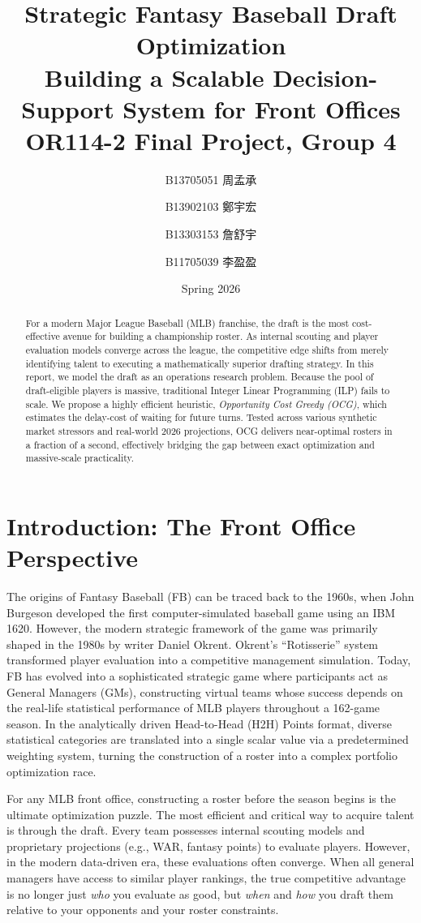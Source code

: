 \documentclass[11pt,a4paper]{article}
\title{\textbf{Strategic Fantasy Baseball Draft Optimization} \\[0.5em] \large Building a Scalable Decision-Support System for Front Offices \\[1em] \normalsize OR114-2 Final Project, Group 4}
\author{
B13705051 周孟承 \and
B13902103 鄭宇宏 \and
B13303153 詹舒宇 \and
B11705039 李盈盈
}
\date{Spring 2026}
\begin{document}
\maketitle

\begin{abstract}
For a modern Major League Baseball (MLB) franchise, the draft is the most cost-effective avenue for building a championship roster. As internal scouting and player evaluation models converge across the league, the competitive edge shifts from merely identifying talent to executing a mathematically superior drafting strategy. In this report, we model the draft as an operations research problem. Because the pool of draft-eligible players is massive, traditional Integer Linear Programming (ILP) fails to scale. We propose a highly efficient heuristic, \emph{Opportunity Cost Greedy (OCG)}, which estimates the delay-cost of waiting for future turns. Tested across various synthetic market stressors and real-world 2026 projections, OCG delivers near-optimal rosters in a fraction of a second, effectively bridging the gap between exact optimization and massive-scale practicality.
\end{abstract}

\section{Introduction: The Front Office Perspective}

The origins of Fantasy Baseball (FB) can be traced back to the 1960s, when John Burgeson developed the first computer-simulated baseball game using an IBM 1620. However, the modern strategic framework of the game was primarily shaped in the 1980s by writer Daniel Okrent. Okrent's ``Rotisserie'' system transformed player evaluation into a competitive management simulation. Today, FB has evolved into a sophisticated strategic game where participants act as General Managers (GMs), constructing virtual teams whose success depends on the real-life statistical performance of MLB players throughout a 162-game season. In the analytically driven Head-to-Head (H2H) Points format, diverse statistical categories are translated into a single scalar value via a predetermined weighting system, turning the construction of a roster into a complex portfolio optimization race.

For any MLB front office, constructing a roster before the season begins is the ultimate optimization puzzle. The most efficient and critical way to acquire talent is through the draft. Every team possesses internal scouting models and proprietary projections (e.g., WAR, fantasy points) to evaluate players. However, in the modern data-driven era, these evaluations often converge. When all general managers have access to similar player rankings, the true competitive advantage is no longer just \textit{who} you evaluate as good, but \textit{when} and \textit{how} you draft them relative to your opponents and your roster constraints.
\end{document}
